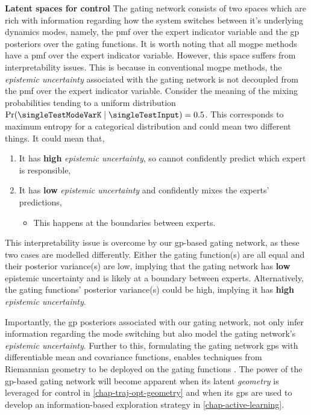 \documentclass{mimosis-class/mimosis}
\numberwithin{equation}{chapter}
\begin{document}
{\textbf{Latent spaces for control}
The gating network consists of two spaces which are rich with information regarding how the
system switches between it's underlying dynamics modes,
namely, the pmf over the expert indicator variable and the \acrshort{gp} posteriors over the gating functions.
It is worth noting that all \acrshort{mogpe} methods have a pmf over the expert indicator variable.
However, this space suffers from interpretability issues.
This is because in conventional \acrshort{mogpe} methods, the \emph{epistemic uncertainty} associated with the
gating network is not decoupled from the pmf over the expert indicator variable.
Consider the meaning of the mixing probabilities tending to a uniform
distribution \({\Pr(\singleTestModeVarK \mid \singleTestInput)=0.5}\).
This corresponds to maximum entropy for a categorical distribution and could mean two different things.
It could mean that,
\begin{enumerate}
\item It has \textbf{\textbf{high}} \emph{epistemic uncertainty}, so cannot confidently predict which expert is responsible,
\item It has \textbf{\textbf{low}} \emph{epistemic uncertainty} and confidently mixes the experts' predictions,
\begin{itemize}
\item This happens at the boundaries between experts.
\end{itemize}
\end{enumerate}
This interpretability issue is overcome by our \acrshort{gp}-based gating network, as these two cases are modelled differently.
Either the gating function(s) are all equal and their posterior variance(s) are low, implying that the gating network
has \textbf{\textbf{low}} epistemic uncertainty and is likely at a boundary between experts.
Alternatively, the gating functions' posterior variance(s) could be high, implying it has \textbf{\textbf{high}} \emph{epistemic uncertainty}.

Importantly, the \acrshort{gp} posteriors associated with our gating network, not only infer information regarding the
mode switching but also model the gating network's \emph{epistemic uncertainty}.
Further to this, formulating the gating network \acrshort{gps}
with differentiable mean and covariance functions, enables techniques from Riemannian geometry
to be deployed on the gating functions \citep{carmoRiemannian1992}.
The power of the \acrshort{gp}-based gating network will become apparent
when its latent \emph{geometry} is leveraged for control in \cref{chap-traj-opt-geometry} and when
its \acrshort{gps} are used to develop an information-based exploration strategy in \cref{chap-active-learning}.

}
\end{document}
